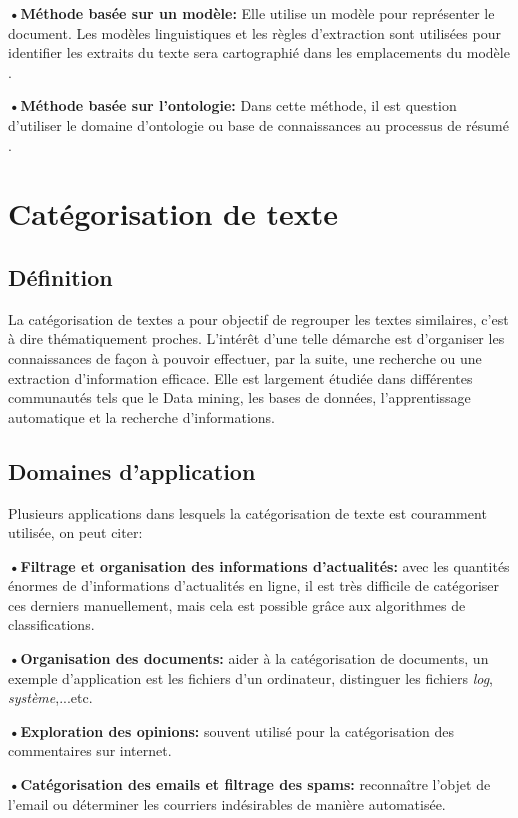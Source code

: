         \textbf{•Méthode basée sur un modèle:} Elle utilise un modèle pour représenter le document. Les modèles linguistiques et les règles d'extraction sont utilisées pour identifier les extraits du texte sera cartographié dans les emplacements du modèle \cite{5}.

        \textbf{•Méthode basée sur l'ontologie:} Dans cette méthode, il est question d'utiliser le domaine d'ontologie ou base de connaissances au processus de résumé \cite{ram}.
 
        

\section{Catégorisation de texte}
    \subsection{Définition}
    La catégorisation de textes a pour objectif de regrouper les textes similaires, c'est à dire thématiquement proches. L'intérêt d'une telle démarche est d'organiser les connaissances de façon à pouvoir effectuer, par la suite, une recherche ou une extraction d'information efficace. Elle est largement étudiée dans différentes communautés tels que le Data mining, les bases de données, l'apprentissage automatique et la recherche d'informations.

    \subsection{Domaines d'application}
    Plusieurs applications dans lesquels la catégorisation de texte est couramment utilisée, on peut citer:

    \textbf{•Filtrage et organisation des informations d'actualités:} avec les quantités énormes de d'informations d'actualités en ligne, il est très difficile de catégoriser ces derniers manuellement, mais cela est possible grâce aux algorithmes de classifications. 

    \textbf{•Organisation des documents:} aider à la catégorisation de documents, un exemple d'application est les fichiers d'un ordinateur, distinguer les fichiers \emph{log}, \emph{système},...etc.

    \textbf{•Exploration des opinions:} souvent utilisé pour la catégorisation des commentaires sur internet.

    \textbf{•Catégorisation des emails et filtrage des spams:} reconnaître l'objet de l'email ou déterminer les courriers indésirables de manière automatisée.
     
